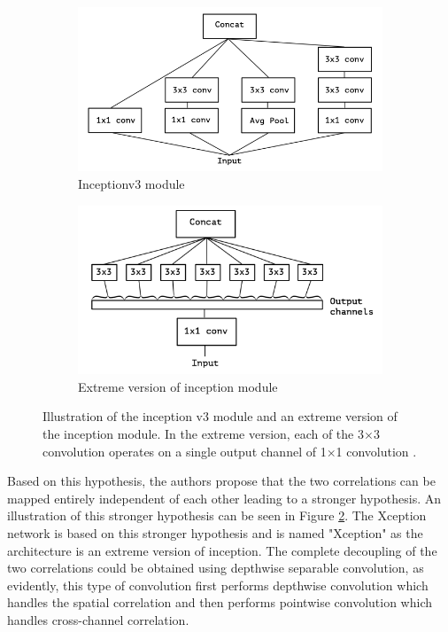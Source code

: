 	\begin{figure}[h]
		\begin{subfigure}{.5\textwidth}
			\centering
			\includegraphics[width=1\linewidth]{images/inception_v3}
			\caption{Inceptionv3 module}
			\label{Fig:xceptiona}
		\end{subfigure}
		\begin{subfigure}{.5\textwidth}
			\centering
			\includegraphics[width=1\linewidth]{images/extreme_inception}
			\caption{Extreme version of inception module}
			\label{Fig:xceptionb}
		\end{subfigure}
		\caption{Illustration of the inception v3 module and an extreme version of the inception module. In the extreme version, each of the 3$\times$3 convolution operates on a single output channel of 1$\times$1 convolution \cite{DBLP:journals/corr/Chollet16a}.}
		\label{Fig:xception}
	\end{figure}

Based on this hypothesis, the authors propose that the two correlations can be mapped entirely independent of each other leading to a stronger hypothesis. An illustration of this stronger hypothesis can be seen in Figure \ref{Fig:xceptionb}. The Xception network is based on this stronger hypothesis and is named "Xception" as the architecture is an extreme version of inception. The complete decoupling of the two correlations could be obtained using depthwise separable convolution, as evidently, this type of convolution first performs depthwise convolution which handles the spatial correlation and then performs pointwise convolution which handles cross-channel correlation.

